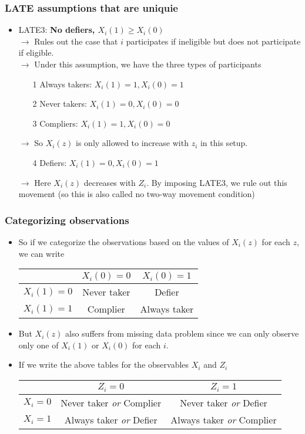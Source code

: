 \documentclass[aspectratio=169]{beamer}
\begin{document}
\begin{frame}
\frametitle{LATE assumptions that are uniquie}
\begin{itemize}
\item LATE3: \textbf{No defiers, $X_i(1)\geq X_i(0)$} \\
$\to$ Rules out the case that $i$ participates if ineligible but does not participate if eligible. \\
$\to$ Under this assumption, we have the three types of participants
\begin{itemize}
\item[1] Always takers: $X_i(1)=1, X_i(0)=1$
\item[2] Never takers: $X_i(1)=0, X_i(0)=0$
\item[3] Compliers: $X_i(1)=1, X_i(0)=0$
\end{itemize}
$\to$  So $X_i(z)$ is only allowed to increase with $z_i$ in this setup. 
\begin{itemize}
\item[4] Defiers: $X_i(1)=0, X_i(0)=1$
\end{itemize}
$\to$ Here $X_i(z)$ decreases with $Z_i$. By imposing LATE3, we rule out this movement (so this is also called no two-way movement condition)
\end{itemize}
\end{frame}

\begin{frame}
\frametitle{Categorizing observations}
\begin{itemize}
\item So if we categorize the observations based on the values of $X_i(z)$ for each $z$, we can write
\begin{center}
\begin{tabular}{r |c c}
& $X_i(0)=0$ &$X_i(0)=1$\\ \hline
$X_i(1)=0$& Never taker& Defier\\
$X_i(1)=1$ & Complier & Always taker\\
\end{tabular}
\end{center}
\item But $X_i(z)$ also suffers from missing data problem since we can only observe only one of $X_i(1)$ or $X_i(0)$ for each $i$. 
\item If we write the above tables for the observables $X_i$ and $Z_i$
\begin{center}
\begin{tabular}{r |c c}
& $Z_i=0$ &$Z_i=1$\\ \hline
$X_i=0$& Never taker \textit{or} Complier &Never taker \textit{or} Defier\\
$X_i=1$ & Always taker \textit{or} Defier & Always taker \textit{or} Complier\\
\end{tabular}
\end{center}
\end{itemize}
\end{frame}
\end{document}
